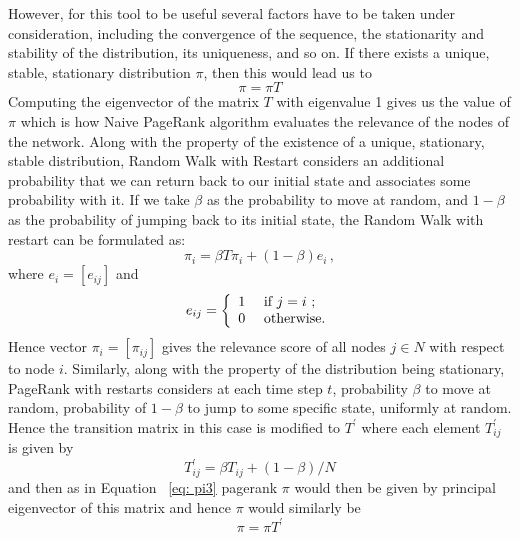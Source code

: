\documentclass{sig-alternate}
\begin{document}
However, for this tool to be useful several factors have to be taken under consideration, including the convergence of the sequence, the stationarity and stability of the distribution, its uniqueness, and so on. If there exists a unique, stable, stationary distribution $\pi$, then this would lead us to
\begin{equation}
\label{eq: pi3}
\pi = \pi{T}
\end{equation}
Computing the eigenvector of the matrix $T$ with eigenvalue 1 gives us the value of $\pi$ which is how  Naive PageRank algorithm evaluates the relevance of the nodes of the network.
Along with the property of the existence of a unique,  stationary, stable distribution, Random Walk with Restart considers an additional probability  that we can return back to our initial state and associates some probability with it.
If we take $\beta$ as the probability to move at random, and $1-\beta$ as the probability of jumping back to its initial state, the Random Walk with restart can be formulated as:
\begin{equation}
\label{eq: pi4}
\pi_i = \beta T \pi_i +(1-\beta) e_i\,,
\end{equation}
where $e_i=[e_{ij}]$ and
\[
e_{ij}= \left \{ \begin {array} {ll}
1 & \mbox{ if  $ j=i$  } ; \\
0 & \mbox{ otherwise}.
\end{array}
\right. \]
Hence vector $\pi_i = [\pi_{ij}] $ gives the relevance score of all nodes $j \in N$ with respect to node $i$.
Similarly, along with the property of the distribution being stationary, PageRank with restarts considers at each time step $t$, probability  $\beta$ to move at random, probability of $1-\beta$ to jump to some specific state, uniformly at random. Hence the transition matrix in this case is modified to $T^{\prime}$ where each element $T_{ij}^{\prime} $ is given by
\begin{equation}
\label{eq: pi5}
T_{ij}^{\prime }= \beta T_{ij} + (1-\beta)/N
\end{equation}
and then as in Equation ~\ref{eq: pi3}  pagerank $\pi$ would then be given by principal eigenvector of this matrix and hence $\pi$ would similarly be
\begin{equation}
\label{eq: pi5a}
\pi= \pi T^{\prime}
\end{equation}
\end{document}

